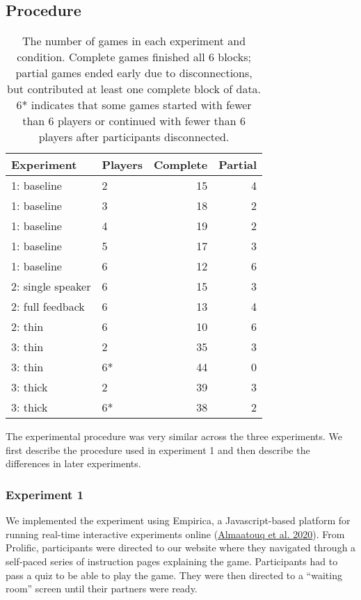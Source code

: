 \documentclass[
  english,
  a4paper,
]{article}
\begin{document}
\hypertarget{procedure}{%
\subsection{Procedure}\label{procedure}}

\begin{table}

\caption{\label{tab:participants}The number of games in each experiment and condition. Complete games finished all 6 blocks; partial games ended early due to disconnections, but contributed at least one complete block of data. 6* indicates that some games started with fewer than 6 players or continued with fewer than 6 players after participants disconnected.}
\centering
\begin{tabular}[t]{l|l|r|r}
\hline
Experiment & Players & Complete & Partial\\
\hline
1: baseline & 2 & 15 & 4\\
\hline
1: baseline & 3 & 18 & 2\\
\hline
1: baseline & 4 & 19 & 2\\
\hline
1: baseline & 5 & 17 & 3\\
\hline
1: baseline & 6 & 12 & 6\\
\hline
2: single speaker & 6 & 15 & 3\\
\hline
2: full feedback & 6 & 13 & 4\\
\hline
2: thin & 6 & 10 & 6\\
\hline
3: thin & 2 & 35 & 3\\
\hline
3: thin & 6* & 44 & 0\\
\hline
3: thick & 2 & 39 & 3\\
\hline
3: thick & 6* & 38 & 2\\
\hline
\end{tabular}
\end{table}

The experimental procedure was very similar across the three experiments. We first describe the procedure used in experiment 1 and then describe the differences in later experiments.

\hypertarget{experiment-1}{%
\subsubsection{Experiment 1}\label{experiment-1}}

We implemented the experiment using Empirica, a Javascript-based platform for running real-time interactive experiments online (\protect\hyperlink{ref-almaatouqEmpiricaVirtualLab2020}{Almaatouq et al. 2020}). From Prolific, participants were directed to our website where they navigated through a self-paced series of instruction pages explaining the game. Participants had to pass a quiz to be able to play the game. They were then directed to a ``waiting room'' screen until their partners were ready.
\end{document}
